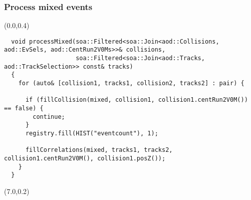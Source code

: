 \documentclass[14pt,aspectratio=169,t]{beamer}
\begin{document}
\begin{frame}[fragile]
  \frametitle{Process mixed events}
  \begin{textblock}{6}(0.0,0.4)
    {\tiny\color{blue}
    \vspace{-0.2in}
    \begin{verbatim}
  void processMixed(soa::Filtered<soa::Join<aod::Collisions, aod::EvSels, aod::CentRun2V0Ms>>& collisions,
                    soa::Filtered<soa::Join<aod::Tracks, aod::TrackSelection>> const& tracks)
  {
    for (auto& [collision1, tracks1, collision2, tracks2] : pair) {

      if (fillCollision(mixed, collision1, collision1.centRun2V0M()) == false) {
        continue;
      }
      registry.fill(HIST("eventcount"), 1);

      fillCorrelations(mixed, tracks1, tracks2, collision1.centRun2V0M(), collision1.posZ());
    }
  }
    \end{verbatim}}
  \end{textblock}
  \begin{textblock}{6}(7.0,0.2)
    {\tiny\color{blue}
    \vspace{-0.0in}
    \begin{verbatim}
    \end{verbatim}}
  \end{textblock}
\end{frame}
\end{document}
